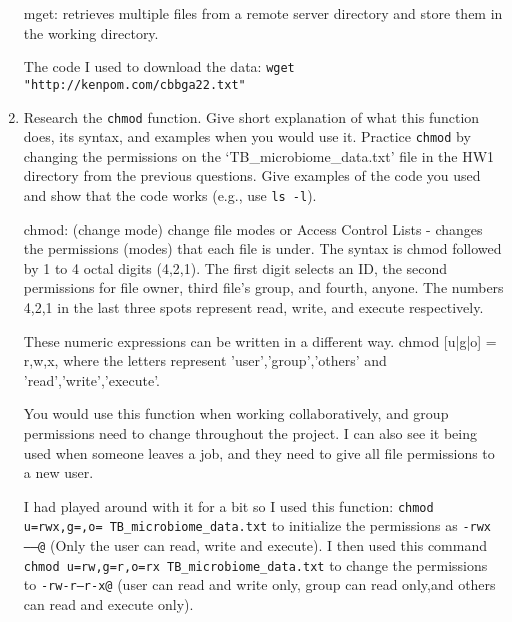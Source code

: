 \documentclass[11pt]{article}
\begin{document}
\begin{enumerate}
	mget: retrieves multiple files from a remote server directory and store them in the working directory. 
	
	The code I used to download the data: \texttt{wget "http://kenpom.com/cbbga22.txt"} 
	
	
	\item Research the \texttt{chmod} function. Give short explanation of what this function does, its syntax, and examples when you would use it. Practice \texttt{chmod} by changing the permissions on the `TB\_microbiome\_data.txt' file in the HW1 directory from the previous questions. Give examples of the code you used and show that the code works (e.g., use \texttt{ls -l}). 
	
	chmod: (change mode) change file modes or Access Control Lists - changes the permissions (modes) that each file is under. The syntax is chmod followed by 1 to 4 octal digits (4,2,1). The first digit selects an ID, the second permissions for file owner, third file's group, and fourth, anyone. The numbers 4,2,1 in the last three spots represent read, write, and execute respectively.
	
	These numeric expressions can be written in a different way. chmod [u|g|o] = {r,w,x}, where the letters represent 'user','group','others' and 'read','write','execute'. 
	
	You would use this function when working collaboratively, and group permissions need to change throughout the project. I can also see it being used when someone leaves a job, and they need to give all file permissions to a new user.  
	
	I had played around with it for a bit so I used this function: \texttt{chmod u=rwx,g=,o= TB\_microbiome\_data.txt} to initialize the permissions as \texttt{-rwx------@} (Only the user can read, write and execute). I then used this command \texttt{chmod u=rw,g=r,o=rx TB\_microbiome\_data.txt} to change the permissions to \texttt{-rw-r--r-x@} (user can read and write only, group can read only,and others can read and execute only).
	
	\newpage
	

\end{enumerate}
\end{document}
